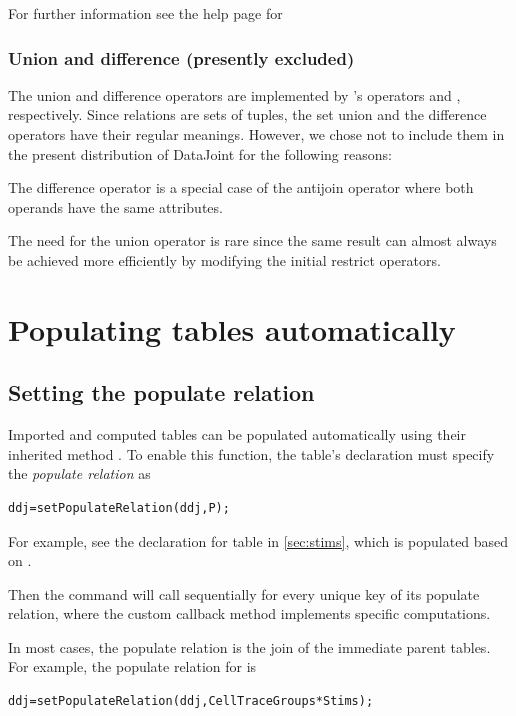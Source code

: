 \documentclass[10pt]{article}
\begin{document}
For further information see the help page for 

\subsubsection{Union and difference (presently excluded)}
The union and difference operators are implemented by 's operators \mcode{+} and \mcode{-}, respectively. Since relations are sets of tuples, the set union and the difference operators have their regular meanings. However, we chose not to include them in the present distribution of DataJoint for the following reasons:

The difference operator  is a special case of the antijoin operator  where both operands have the same attributes.  

The need for the union operator is rare since the same result can almost always be achieved more efficiently by modifying the initial restrict operators. 

\newpage\section{Populating tables automatically}
\subsection{Setting the populate relation}
Imported and computed tables can be populated automatically using their inherited method . 
To enable this function, the table's  declaration must specify the {\em populate relation}  as
\begin{lstlisting}
ddj=setPopulateRelation(ddj,P);
\end{lstlisting}
For example, see the declaration for table  in \autoref{sec:stims}, which is populated based on .

Then the command  will call  sequentially for every unique key of its populate relation, where the custom callback method  implements specific computations.

In most cases, the populate relation is the join of the immediate parent tables. For example, the populate relation for  is
\begin{lstlisting}
ddj=setPopulateRelation(ddj,CellTraceGroups*Stims);
\end{lstlisting}
\end{document}
